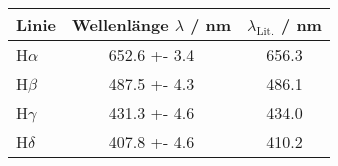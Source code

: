 \begin{tabular}{lSS}
\toprule
{Linie}   & {Wellenlänge $\lambda$ / \si{\nano\metre}} & {$\lambda_\mathrm{Lit.}$ / \si{\nano\metre}}\\
\midrule
H$\alpha$     & 652.6 +- 3.4 & 656.3 \\
H$\beta$      & 487.5 +- 4.3 & 486.1 \\
H$\gamma$     & 431.3 +- 4.6 & 434.0 \\
H$\delta$     & 407.8 +- 4.6 & 410.2 \\ 
\bottomrule
\end{tabular}